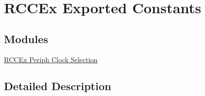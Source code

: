 \hypertarget{group___r_c_c_ex___exported___constants}{\section{R\-C\-C\-Ex Exported Constants}
\label{group___r_c_c_ex___exported___constants}
}
\subsection*{Modules}
\begin{DoxyCompactItemize}
\item 
\hyperlink{group___r_c_c_ex___periph___clock___selection}{R\-C\-C\-Ex Periph Clock Selection}
\end{DoxyCompactItemize}


\subsection{Detailed Description}
